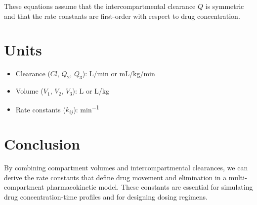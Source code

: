 \documentclass[11pt]{article}
\begin{document}
These equations assume that the intercompartmental clearance $Q$ is symmetric and that the rate constants are first-order with respect to drug concentration.

\section*{Units}
\begin{itemize}
    \item Clearance ($Cl$, $Q_2$, $Q_3$): \si{L/min} or \si{mL/kg/min}
    \item Volume ($V_1$, $V_2$, $V_3$): \si{L} or \si{L/kg}
    \item Rate constants ($k_{ij}$): \si{min^{-1}}
\end{itemize}

\section*{Conclusion}
By combining compartment volumes and intercompartmental clearances, we can derive the rate constants that define drug movement and elimination in a multi-compartment pharmacokinetic model. These constants are essential for simulating drug concentration-time profiles and for designing dosing regimens.
\end{document}

